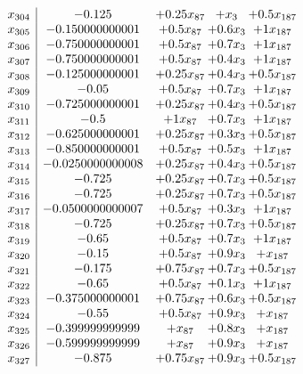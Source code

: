 \documentclass[11pt]{article}
\begin{document}
\[\begin{array}{c| c c@{\hskip 2pt} c@{\hskip 2pt} c@{\hskip 2pt} }
 x_{304}   &  -0.125 & + 0.25 x_{87} & +  x_{3} & + 0.5 x_{187}\\
 x_{305}   &  -0.150000000001 & + 0.5 x_{87} & + 0.6 x_{3} & + 1 x_{187}\\
 x_{306}   &  -0.750000000001 & + 0.5 x_{87} & + 0.7 x_{3} & + 1 x_{187}\\
 x_{307}   &  -0.750000000001 & + 0.5 x_{87} & + 0.4 x_{3} & + 1 x_{187}\\
 x_{308}   &  -0.125000000001 & + 0.25 x_{87} & + 0.4 x_{3} & + 0.5 x_{187}\\
 x_{309}   &  -0.05 & + 0.5 x_{87} & + 0.7 x_{3} & + 1 x_{187}\\
 x_{310}   &  -0.725000000001 & + 0.25 x_{87} & + 0.4 x_{3} & + 0.5 x_{187}\\
 x_{311}   &  -0.5 & + 1 x_{87} & + 0.7 x_{3} & + 1 x_{187}\\
 x_{312}   &  -0.625000000001 & + 0.25 x_{87} & + 0.3 x_{3} & + 0.5 x_{187}\\
 x_{313}   &  -0.850000000001 & + 0.5 x_{87} & + 0.5 x_{3} & + 1 x_{187}\\
 x_{314}   &  -0.0250000000008 & + 0.25 x_{87} & + 0.4 x_{3} & + 0.5 x_{187}\\
 x_{315}   &  -0.725 & + 0.25 x_{87} & + 0.7 x_{3} & + 0.5 x_{187}\\
 x_{316}   &  -0.725 & + 0.25 x_{87} & + 0.7 x_{3} & + 0.5 x_{187}\\
 x_{317}   &  -0.0500000000007 & + 0.5 x_{87} & + 0.3 x_{3} & + 1 x_{187}\\
 x_{318}   &  -0.725 & + 0.25 x_{87} & + 0.7 x_{3} & + 0.5 x_{187}\\
 x_{319}   &  -0.65 & + 0.5 x_{87} & + 0.7 x_{3} & + 1 x_{187}\\
 x_{320}   &  -0.15 & + 0.5 x_{87} & + 0.9 x_{3} & +  x_{187}\\
 x_{321}   &  -0.175 & + 0.75 x_{87} & + 0.7 x_{3} & + 0.5 x_{187}\\
 x_{322}   &  -0.65 & + 0.5 x_{87} & + 0.1 x_{3} & + 1 x_{187}\\
 x_{323}   &  -0.375000000001 & + 0.75 x_{87} & + 0.6 x_{3} & + 0.5 x_{187}\\
 x_{324}   &  -0.55 & + 0.5 x_{87} & + 0.9 x_{3} & +  x_{187}\\
 x_{325}   &  -0.399999999999 & +  x_{87} & + 0.8 x_{3} & +  x_{187}\\
 x_{326}   &  -0.599999999999 & +  x_{87} & + 0.9 x_{3} & +  x_{187}\\
 x_{327}   &  -0.875 & + 0.75 x_{87} & + 0.9 x_{3} & + 0.5 x_{187}\\

\end{array}\]
\end{document}
